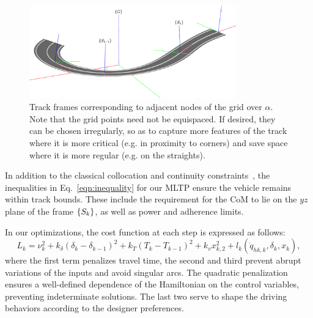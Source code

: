\begin{figure}[h]\centering
	\includegraphics[width=0.8\textwidth]{Images/track_frames.pdf}
	\caption{Track frames corresponding to adjacent nodes of the grid over $\alpha$. Note that the grid points need not be equispaced. If desired, they can be chosen irregularly, so as to capture more features of the track where it is more critical (e.g. in proximity to corners) and save space where it is more regular (e.g. on the straights).}
	\label{fig:track_frames}
\end{figure}

%

In addition to the classical collocation and continuity constraints~\cite{Domenighini:Designs:2023}, the inequalities in Eq.~\eqref{eqn:inequality} for our MLTP ensure the vehicle remains within track bounds. These include the requirement for the CoM to lie on the $yz$ plane of the frame $\left\{S_k\right\}$, as well as power and adherence limits.

In our optimizations, the cost function at each step is expressed as follows:
\begin{equation}\label{eqn:cost}
	L_k=\nu_k^2+k_\delta(\delta_k-\delta_{k-1})^2+k_T(T_k-T_{k-1})^2+k_v x_{k,2}^2 + l_k(\ddot{q}_{hk,k},\delta_k,x_k),
\end{equation}
where the first term penalizes travel time, the second and third prevent abrupt variations of the inputs and avoid singular arcs. The quadratic penalization ensures a well-defined dependence of the Hamiltonian on the control variables, preventing indeterminate solutions. The last two serve to shape the driving behaviors according to the designer preferences.

